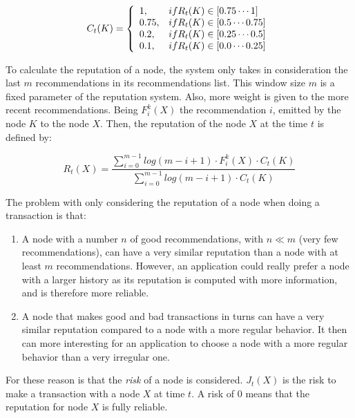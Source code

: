 \begin{equation}
  C_t (K) = \left\{
  \begin{array}{l l}
    1, & if R_t(K) \in [0.75 \cdots 1]\\
    0.75, & if R_t(K) \in [0.5 \cdots 0.75]\\
    0.2,  & if R_t(K) \in [0.25 \cdots 0.5]\\
    0.1, & if R_t(K) \in [0.0 \cdots 0.25]\\
  \end{array}\right.
\end{equation}

To calculate the reputation of a node, the system only takes in consideration
the last $m$ recommendations in its recommendations list. This window size $m$ is
a fixed parameter of the reputation system. Also, more weight is given to the
more recent recommendations. 
Being $F_i^k (X)$ the recommendation $i$, emitted by the node $K$ to the node
$X$. Then, the reputation of the node $X$ at the time $t$ is defined by:

\begin{equation}
  R_t(X) = \frac{\sum_{i=0}^{m-1}  log(m-i+1) \cdot F_i^k(X) \cdot C_t(K)}{
\sum_{i=0}^{m-1} log(m-i+1) \cdot C_t(K)}
\end{equation}


The problem with only considering the reputation of a node when doing a
transaction is that:
\begin{enumerate}
  \item A node with a number $n$ of good recommendations, with $n \ll m$ (very
few recommendations), can have a very similar reputation than a node with at
least $m$ recommendations. However, an application could really prefer a node
with a larger history as its reputation is computed with more information, and
is therefore more reliable.
  \item A node that makes good and bad transactions in turns can have a very
similar reputation compared to a node with a more regular behavior. It then can
more interesting for an application to choose a node with a more regular
behavior than a very irregular one.

\end{enumerate}

For these reason is that the \textit{risk} of a node is considered. $J_t(X)$ is
the risk to make a transaction with a node $X$ at time $t$. A risk of 0
means that the reputation for node $X$ is fully reliable.

